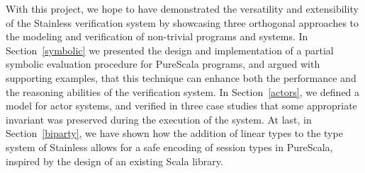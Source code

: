 \documentclass[a4paper,twoside]{article}
\newcommand{\RefSec}[1]{Section~\ref{#1}}
\begin{document}
With this project, we hope to have demonstrated the versatility and extensibility of the Stainless verification system by showcasing three orthogonal approaches to the modeling and verification of non-trivial programs and systems.
In \RefSec{symbolic} we presented the design and implementation of a partial symbolic evaluation procedure for PureScala programs, and argued with supporting examples, that this technique can enhance both the performance and the reasoning abilities of the verification system.
In \RefSec{actors}, we defined a model for actor systems, and verified in three case studies that some appropriate invariant was preserved during the execution of the system.
At last, in \RefSec{biparty}, we have shown how the addition of linear types to the type system of Stainless allows for a safe encoding of session types in PureScala, inspired by the design of an existing Scala library.

\clearpage

\appendix

%

\clearpage



\end{document}
